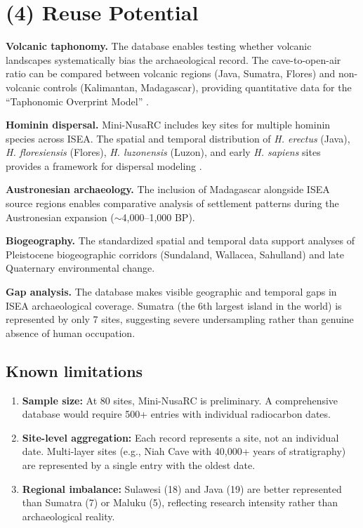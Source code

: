 \documentclass[11pt]{article}
\begin{document}
\section{(4) Reuse Potential}

\textbf{Volcanic taphonomy.} The database enables testing whether volcanic landscapes systematically bias the archaeological record. The cave-to-open-air ratio can be compared between volcanic regions (Java, Sumatra, Flores) and non-volcanic controls (Kalimantan, Madagascar), providing quantitative data for the ``Taphonomic Overprint Model'' \citep{amien2026taphonomic}.

\textbf{Hominin dispersal.} Mini-NusaRC includes key sites for multiple hominin species across ISEA. The spatial and temporal distribution of \textit{H. erectus} (Java), \textit{H. floresiensis} (Flores), \textit{H. luzonensis} (Luzon), and early \textit{H. sapiens} sites provides a framework for dispersal modeling \citep{détroit2019luzon, brumm2010flores}.

\textbf{Austronesian archaeology.} The inclusion of Madagascar alongside ISEA source regions enables comparative analysis of settlement patterns during the Austronesian expansion ($\sim$4,000--1,000 BP).

\textbf{Biogeography.} The standardized spatial and temporal data support analyses of Pleistocene biogeographic corridors (Sundaland, Wallacea, Sahulland) and late Quaternary environmental change.

\textbf{Gap analysis.} The database makes visible geographic and temporal gaps in ISEA archaeological coverage. Sumatra (the 6th largest island in the world) is represented by only 7 sites, suggesting severe undersampling rather than genuine absence of human occupation.

\subsection{Known limitations}

\begin{enumerate}
    \item \textbf{Sample size:} At 80 sites, Mini-NusaRC is preliminary. A comprehensive database would require 500+ entries with individual radiocarbon dates.
    \item \textbf{Site-level aggregation:} Each record represents a site, not an individual date. Multi-layer sites (e.g., Niah Cave with 40,000+ years of stratigraphy) are represented by a single entry with the oldest date.
    \item \textbf{Regional imbalance:} Sulawesi (18) and Java (19) are better represented than Sumatra (7) or Maluku (5), reflecting research intensity rather than archaeological reality.
\end{enumerate}
\end{document}
